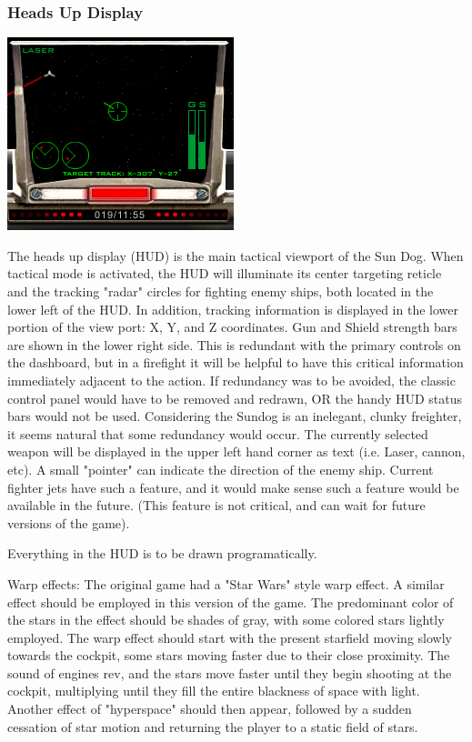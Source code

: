 \subsubsection{Heads Up Display}

\includegraphics[scale=0.7]{images/hud.png}

The heads up display (HUD) is the main tactical viewport of the Sun Dog.  When
tactical mode is activated, the HUD will illuminate its center targeting reticle
and the tracking "radar" circles for fighting enemy ships, both located in the lower left of the HUD.  In addition, tracking information is displayed in the lower portion of the view port: X, Y, and Z coordinates. Gun and Shield strength bars are shown in the lower right side. This is redundant with the primary controls on the dashboard, but in a firefight it will be helpful to have this critical information immediately adjacent to the action. If redundancy was to be avoided, the classic control panel would have to be removed and redrawn, OR the handy HUD status bars would not be used. Considering the Sundog is an inelegant, clunky freighter, it seems natural that some redundancy would occur. The currently selected weapon will be displayed in the upper left hand corner as text (i.e. Laser, cannon, etc). A small "pointer" can indicate the direction of the enemy ship. Current fighter jets have such a feature, and it would make sense such a feature would be available in the future. (This feature is not critical, and can wait for future versions of the game). 

Everything in the HUD is to be drawn programatically. 

Warp effects: The original game had a "Star Wars" style warp effect. A similar effect should be employed in this version of the game. The predominant color of the stars in the effect should be shades of gray, with some colored stars lightly employed. The warp effect should start with the present starfield moving slowly towards the cockpit, some stars moving faster due to their close proximity. The sound of engines rev, and the stars move faster until they begin shooting at the cockpit, multiplying until they fill the entire blackness of space with light. Another effect of "hyperspace" should then appear, followed by a sudden cessation of star motion and returning the player to a static field of stars. 


